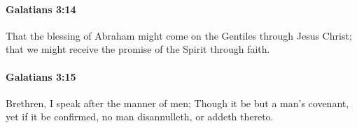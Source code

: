 		\paragraph{Galatians 3:14} %
			\label{GALATIANS-3-14}

			That the blessing of Abraham might come on the Gentiles through Jesus Christ; that we might receive the promise of the Spirit through faith.

			\begin{framed}
			\scriptsize
				\begin{compactdesc}
					\item[SBLG] 
				\end{compactdesc}
			\end{framed}

		\paragraph{Galatians 3:15} %
			\label{GALATIANS-3-15}

			Brethren, I speak after the manner of men; Though it be but a man's covenant, yet if it be confirmed, no man disannulleth, or addeth thereto.

